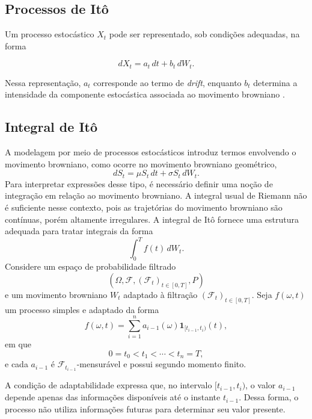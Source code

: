 \subsection{Processos de Itô}
Um processo estocástico $X_t$ pode ser representado, sob condições
adequadas, na forma

\begin{equation}
dX_t = a_t\,dt + b_t\,dW_t.
\label{eq:processo-ito}
\end{equation}

Nessa representação, $a_t$ corresponde ao termo de \textit{drift},
enquanto $b_t$ determina a intensidade da componente estocástica
associada ao movimento browniano \cite{albani2025}.
\subsection{Integral de Itô}

A modelagem por meio de processos estocásticos introduz termos envolvendo
o movimento browniano, como ocorre no movimento browniano geométrico,
\begin{equation}
dS_t = \mu S_t\,dt + \sigma S_t\,dW_t.
\end{equation}
Para interpretar expressões desse tipo, é necessário definir uma noção de
integração em relação ao movimento browniano. A integral usual de Riemann
não é suficiente nesse contexto, pois as trajetórias do movimento browniano
são contínuas, porém altamente irregulares. A integral de Itô fornece uma
estrutura adequada para tratar integrais da forma
\begin{equation}
\int_0^T f(t)\,dW_t.
\end{equation}
Considere um espaço de probabilidade filtrado
\begin{equation}
(\Omega,\mathcal{F},(\mathcal{F}_t)_{t\in[0,T]},P)
\end{equation}
e um movimento browniano $W_t$ adaptado à filtração
$(\mathcal{F}_t)_{t\in[0,T]}$. Seja $f(\omega,t)$ um processo simples e
adaptado da forma
\begin{equation}
f(\omega,t)
=
\sum_{i=1}^{n}
a_{i-1}(\omega)
\mathbf{1}_{[t_{i-1},t_i)}(t),
\end{equation}
em que
\begin{equation}
0=t_0<t_1<\cdots<t_n=T,
\end{equation}
e cada $a_{i-1}$ é $\mathcal{F}_{t_{i-1}}$-mensurável e possui segundo
momento finito.

A condição de adaptabilidade expressa que, no intervalo
$[t_{i-1},t_i)$, o valor $a_{i-1}$ depende apenas das informações
disponíveis até o instante $t_{i-1}$. Dessa forma, o processo não utiliza
informações futuras para determinar seu valor presente.


